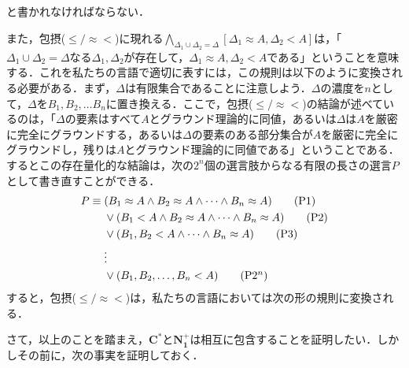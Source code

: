 \documentclass[twoside,14Q,dvipdfmx]{jsarticle}
\theoremstyle{definition}
\begin{document}
と書かれなければならない．

また，包摂($\leq/\approx<$)に現れる$\bigwedge_{\Delta_1\cup\Delta_2=\Delta}[\Delta_1\approx A, \Delta_2<A]$は，「$\Delta_1\cup\Delta_2=\Delta$なる$\Delta_1, \Delta_2$が存在して，$\Delta_1\approx A, \Delta_2<A$である」ということを意味する．これを私たちの言語で適切に表すには，この規則は以下のように変換される必要がある．まず，$\Delta$は有限集合であることに注意しよう．$\Delta$の濃度を$n$として，$\Delta$を$B_1, B_2, \ldots B_n$に置き換える．ここで，包摂($\leq/\approx<$)の結論が述べているのは，「$\Delta$の要素はすべて$A$とグラウンド理論的に同値，あるいは$\Delta$は$A$を厳密に完全にグラウンドする，あるいは$\Delta$の要素のある部分集合が$A$を厳密に完全にグラウンドし，残りは$A$とグラウンド理論的に同値である」ということである．するとこの存在量化的な結論は，次の$2^{n}$個の選言肢からなる有限の長さの選言$P$として書き直すことができる．
\begin{align}
P\equiv\;&(B_1\approx A\land B_2\approx A\land\cdots\land B_n\approx A)\tag{P1}\\
&\lor(B_1<A\land B_2\approx A\land\cdots\land B_n\approx A)\tag{P2}\\
&\lor(B_1, B_2<A\land\cdots\land B_n\approx A)\tag{P3}\\
&\vdots\notag\\
&\lor(B_1, B_2, \ldots, B_n<A)\tag{P2$^{n}$}
\end{align}
すると，包摂($\leq/\approx<$)は，私たちの言語においては次の形の規則に変換される．

\begin{prooftree}
\end{prooftree}

さて，以上のことを踏まえ，$\mathbf{C^{*}}$と$\mathbf{N_{1}^{+}}$は相互に包含することを証明したい．しかしその前に，次の事実を証明しておく．
\end{document}
